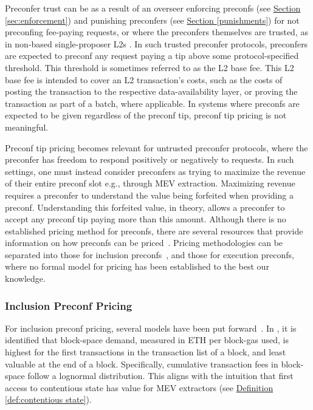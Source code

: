\documentclass[a4paper]{article}
\theoremstyle{boldstyle}
\begin{document}
     Preconfer trust can be as a result of an overseer enforcing preconfs (see \hyperref[sec:enforcement]{Section \ref{sec:enforcement}}) and punishing preconfers (see \hyperref[sec:enforcement]{Section \ref{punishments}}) for not preconfing fee-paying requests, or where the preconfers themselves are trusted, as in non-based single-proposer L2s \cite{Optimism,Arbitrum,ZKsync}. In such trusted preconfer protocols, preconfers are expected to preconf any request paying a tip above some protocol-specified threshold.
     This threshold is sometimes referred to as the L2 base fee. This L2 base fee is intended to cover an L2 transaction's costs, such as the costs of posting the transaction to the respective data-availability layer, or proving the transaction as part of a batch, where applicable. In systems where preconfs are expected to be given regardless of the preconf tip, preconf tip pricing is not meaningful.
     
     Preconf tip pricing becomes relevant for untrusted preconfer protocols, where the preconfer has freedom to respond positively or negatively to requests. In such settings, one must instead consider preconfers as trying to maximize the revenue of their entire preconf slot e.g., through MEV extraction. Maximizing revenue requires a preconfer to understand the value being forfeited when providing a preconf. Understanding this forfeited value, in theory, allows a preconfer to accept any preconf tip paying more than this amount. Although there is no established pricing method for preconfs, there are several resources that provide information on how preconfs can be priced~\cite{W:APricingModelforInclusionPreconfirmations,W:PricingTransactionsforPreconfirmation}. Pricing methodologies can be separated into those for inclusion preconfs~\cite{W:APricingModelforInclusionPreconfirmations,W:PricingTransactionsforPreconfirmation}, and those for execution preconfs, where no formal model for pricing has been established to the best our knowledge.
     
     \subsubsection{Inclusion Preconf Pricing}
     For inclusion preconf pricing, several models have been put forward~\cite{W:APricingModelforInclusionPreconfirmations,W:PricingTransactionsforPreconfirmation}. In \cite{W:APricingModelforInclusionPreconfirmations}, it is identified that block-space demand, measured in ETH per block-gas used, is highest for the first transactions in the transaction list of a block, and least valuable at the end of a block. Specifically, cumulative transaction fees in block-space follow a lognormal distribution. This aligns with the intuition that first access to contentious state has value for MEV extractors (see \hyperref[def:contentious state]{Definition \ref{def:contentious state}}).
     
\end{document}
